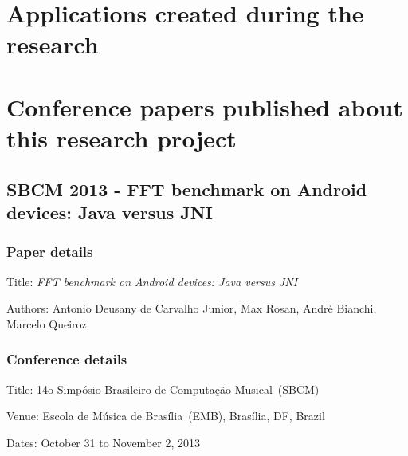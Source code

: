 
 

 \chapter{Applications created during the research}
 \label{ape:applications}




\chapter{Conference papers published about this research project}
\label{ape:papers}


\section{SBCM 2013 - FFT benchmark on Android devices: Java versus JNI}
\label{ape:papersbcm2013}

\subsection*{Paper details}

Title: \textit{FFT benchmark on Android devices: Java versus JNI}

Authors: Antonio Deusany de Carvalho Junior, Max Rosan, André Bianchi, Marcelo Queiroz

\subsection*{Conference details}

Title: 14o Simpósio Brasileiro de Computação Musical~(SBCM)

Venue: Escola de Música de Brasília~(EMB), Brasília, DF, Brazil

Dates: October 31 to November 2, 2013



